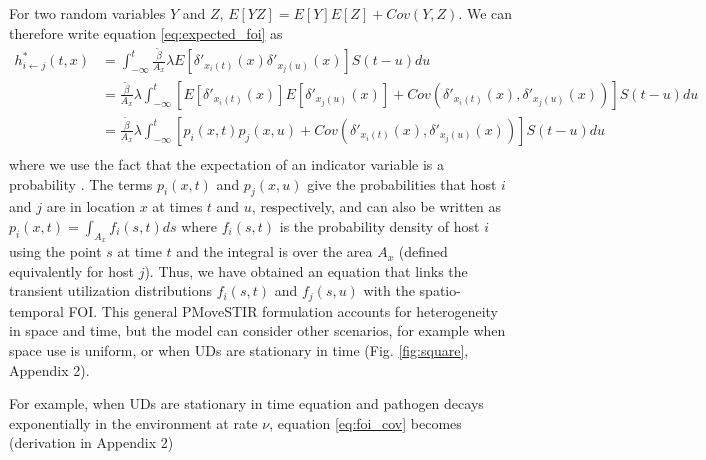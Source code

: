\documentclass[letterpaper]{article}
\begin{document}
For two random variables $Y$ and $Z$, $E[YZ] = E[Y]E[Z] + Cov(Y, Z)$.  We can therefore write equation \ref{eq:expected_foi} as
\begin{equation}
    \begin{aligned}
        h^*_{i \leftarrow j}(t, x) &= \int_{-\infty}^{t} \frac{\tilde{\beta}}{A_x} \lambda E[\delta'_{x_i(t)}(x) \delta'_{x_j(u)}(x)] S(t - u) du \\
        &= \frac{\tilde{\beta}}{A_x} \lambda \int_{-\infty}^{t} [E[\delta'_{x_i(t)}(x)] E[\delta'_{x_j(u)}(x)] + Cov(\delta'_{x_i(t)}(x), \delta'_{x_j(u)}(x))] S(t - u) du \\
        &= \frac{\tilde{\beta}}{A_x} \lambda \int_{-\infty}^{t} [p_i(x, t) p_j(x, u) + Cov(\delta'_{x_i(t)}(x), \delta'_{x_j(u)}(x))] S(t - u) du \\
    \end{aligned}
    \label{eq:foi_cov}
\end{equation}
where we use the fact that the expectation of an indicator variable is a probability \citep{Grimmett2001}. The terms $p_i(x, t)$ and $p_j(x,u)$ give the probabilities that host $i$ and $j$ are in location $x$ at times $t$ and $u$, respectively, and can also be written as $p_i(x, t) = \int_{A_x} f_i(s, t) ds$ where $f_i(s, t)$ is the probability density of host $i$ using the point $s$ at time $t$ and the integral is over the area $A_x$ (defined equivalently for host $j$). Thus, we have obtained an equation that links the transient utilization distributions $f_i(s, t)$ and $f_j(s, u)$ with the spatio-temporal FOI.
This general PMoveSTIR formulation accounts for heterogeneity in space and time, but the model can consider other scenarios, for example when space use is uniform, or when UDs are stationary in time  (Fig. \ref{fig:square}, Appendix 2). 

For example, when UDs are stationary in time equation and pathogen decays exponentially in the environment at rate $\nu$, equation \ref{eq:foi_cov} becomes (derivation in Appendix 2)
\end{document}
